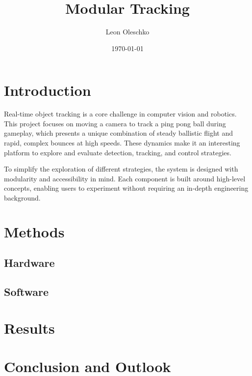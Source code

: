\documentclass[
    parskip=half, 
    twoside=false,
    twocolumn=true,
    fontsize=12pt,
]{scrarticle}
\begin{document}
\title{Modular Tracking}
\author{Leon Oleschko}
\date{\dotdate\today}
\sffamily\maketitle

\section{Introduction}
Real-time object tracking is a core challenge in computer vision and robotics. This project focuses on moving a camera to track a ping pong ball during gameplay, which presents a unique combination of steady ballistic flight and rapid, complex bounces at high speeds. These dynamics make it an interesting platform to explore and evaluate detection, tracking, and control strategies.

To simplify the exploration of different strategies, the system is designed with modularity and accessibility in mind. Each component is built around high-level concepts, enabling users to experiment without requiring an in-depth engineering background.


\section{Methods}
\subsection{Hardware}

\subsection{Software}

\section{Results}

\section{Conclusion and Outlook}
\end{document}
